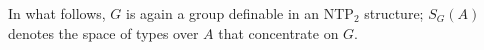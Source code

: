 \documentclass{amsart}
\makeatletter
\numberwithin{equation}{section}
\newtheorem{prop}[thm]{Proposition}
\newtheorem{lemme}[thm]{Lemma}
\theoremstyle{definition}
\theoremstyle{mystyle}
\theoremstyle{remark}
\newcommand{\monster}{\mathcal U}
\DeclareMathOperator{\tp}{tp}
\def\indsym#1#2{%
 \setbox0=\hbox{$\m@th#1x$}%
 \kern\wd0%
 \hbox to 0pt{\hss$\m@th#1\mid$\hbox to 0pt{$\m@th#1^{#2}$\hss}\hss}%
 \lower.9\ht0\hbox to 0pt{\hss$\m@th#1\smile$\hss}%
 \kern\wd0}
\newcommand{\ind}[1][]{\mathop{\mathpalette\indsym{#1}}}
\makeatother
\begin{document}
In what follows, $G$ is again a group definable in an NTP$_2$ structure; $S_G(A)$ denotes the space of types over $A$ that concentrate on $G$.
%
%
%
%
%
\end{document}
